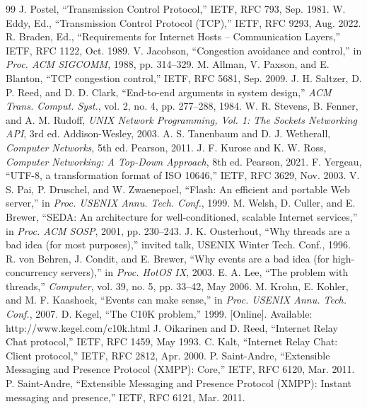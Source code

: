 \documentclass[conference]{IEEEtran}
\begin{document}
\balance
\begin{thebibliography}{99}
 J. Postel, ``Transmission Control Protocol,'' IETF, RFC 793, Sep. 1981.
 W. Eddy, Ed., ``Transmission Control Protocol (TCP),'' IETF, RFC 9293, Aug. 2022.
 R. Braden, Ed., ``Requirements for Internet Hosts -- Communication Layers,'' IETF, RFC 1122, Oct. 1989.
 V. Jacobson, ``Congestion avoidance and control,'' in \emph{Proc. ACM SIGCOMM}, 1988, pp. 314--329.
 M. Allman, V. Paxson, and E. Blanton, ``TCP congestion control,'' IETF, RFC 5681, Sep. 2009.
 J. H. Saltzer, D. P. Reed, and D. D. Clark, ``End-to-end arguments in system design,'' \emph{ACM Trans. Comput. Syst.}, vol. 2, no. 4, pp. 277--288, 1984.
 W. R. Stevens, B. Fenner, and A. M. Rudoff, \emph{UNIX Network Programming, Vol. 1: The Sockets Networking API}, 3rd ed. Addison-Wesley, 2003.
 A. S. Tanenbaum and D. J. Wetherall, \emph{Computer Networks}, 5th ed. Pearson, 2011.
 J. F. Kurose and K. W. Ross, \emph{Computer Networking: A Top-Down Approach}, 8th ed. Pearson, 2021.
 F. Yergeau, ``UTF-8, a transformation format of ISO 10646,'' IETF, RFC 3629, Nov. 2003.
 V. S. Pai, P. Druschel, and W. Zwaenepoel, ``Flash: An efficient and portable Web server,'' in \emph{Proc. USENIX Annu. Tech. Conf.}, 1999.
 M. Welsh, D. Culler, and E. Brewer, ``SEDA: An architecture for well-conditioned, scalable Internet services,'' in \emph{Proc. ACM SOSP}, 2001, pp. 230--243.
 J. K. Ousterhout, ``Why threads are a bad idea (for most purposes),'' invited talk, USENIX Winter Tech. Conf., 1996.
 R. von Behren, J. Condit, and E. Brewer, ``Why events are a bad idea (for high-concurrency servers),'' in \emph{Proc. HotOS IX}, 2003.
 E. A. Lee, ``The problem with threads,'' \emph{Computer}, vol. 39, no. 5, pp. 33--42, May 2006.
 M. Krohn, E. Kohler, and M. F. Kaashoek, ``Events can make sense,'' in \emph{Proc. USENIX Annu. Tech. Conf.}, 2007.
 D. Kegel, ``The C10K problem,'' 1999. [Online]. Available: http://www.kegel.com/c10k.html
 J. Oikarinen and D. Reed, ``Internet Relay Chat protocol,'' IETF, RFC 1459, May 1993.
 C. Kalt, ``Internet Relay Chat: Client protocol,'' IETF, RFC 2812, Apr. 2000.
 P. Saint-Andre, ``Extensible Messaging and Presence Protocol (XMPP): Core,'' IETF, RFC 6120, Mar. 2011.
 P. Saint-Andre, ``Extensible Messaging and Presence Protocol (XMPP): Instant messaging and presence,'' IETF, RFC 6121, Mar. 2011.

\end{thebibliography}
\end{document}
